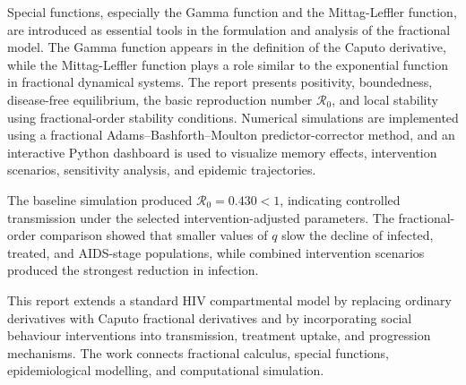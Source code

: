 \documentclass[12pt,a4paper,oneside]{report}
\newcommand{\Rzero}{\mathcal{R}_0}
\begin{document}
Special functions, especially the Gamma function and the Mittag-Leffler function, are introduced as essential tools in the formulation and analysis of the fractional model. The Gamma function appears in the definition of the Caputo derivative, while the Mittag-Leffler function plays a role similar to the exponential function in fractional dynamical systems. The report presents positivity, boundedness, disease-free equilibrium, the basic reproduction number $\Rzero$, and local stability using fractional-order stability conditions. Numerical simulations are implemented using a fractional Adams--Bashforth--Moulton predictor-corrector method, and an interactive Python dashboard is used to visualize memory effects, intervention scenarios, sensitivity analysis, and epidemic trajectories.

The baseline simulation produced $\Rzero=0.430<1$, indicating controlled transmission under the selected intervention-adjusted parameters. The fractional-order comparison showed that smaller values of $q$ slow the decline of infected, treated, and AIDS-stage populations, while combined intervention scenarios produced the strongest reduction in infection.

\begin{remarkbox}[title={Core Contribution}]
This report extends a standard HIV compartmental model by replacing ordinary derivatives with Caputo fractional derivatives and by incorporating social behaviour interventions into transmission, treatment uptake, and progression mechanisms. The work connects fractional calculus, special functions, epidemiological modelling, and computational simulation.
\end{remarkbox}

\newpage
\tableofcontents
\newpage
\listoffigures
{}
\newpage
\listoftables
{}
\newpage
\end{document}
